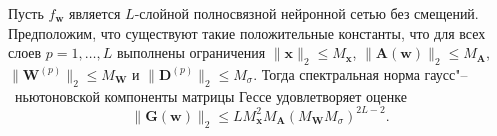 \begin{theorem}
    \label{thm:fcnn-G-bound}
    Пусть $f_{\mathbf{w}}$ является $L$-слойной полносвязной нейронной сетью без смещений. Предположим, что существуют такие положительные константы, что для всех слоев $p = 1, \ldots, L$ выполнены ограничения $\|\mathbf{x}\|_2 \leqslant M_{\mathbf{x}}$, $\|\mathbf{A}(\mathbf{w})\|_2 \leqslant M_{\mathbf{A}}$, $\|\mathbf{W}^{(p)}\|_2 \leqslant M_{\mathbf{W}}$ и $\|\mathbf{D}^{(p)}\|_2 \leqslant M_{\sigma}$. Тогда спектральная норма гаусс"--~ньютоновской компоненты матрицы Гессе удовлетворяет оценке
    \begin{equation}
        \label{eq:fcnn-G-bound}
        \|\mathbf{G}(\mathbf{w})\|_2
        \leqslant
        L M_{\mathbf{x}}^2 M_{\mathbf{A}} \left(M_{\mathbf{W}} M_{\sigma}\right)^{2L-2}.
    \end{equation}
\end{theorem}

